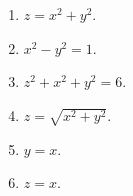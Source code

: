 \begin{enumialphparenastyle}
\begin{ex}
\begin{enumerate}
\item $z=x^{2}+y^{2}$.

\item $x^{2}-y^{2}=1$.

\item $z^{2}+x^{2}+y^{2}=6$.

\item $z=\sqrt{x^{2}+y^{2}}$.

\item $y=x$.

\item $z=x$.
\end{enumerate}
\end{ex}

\end{enumialphparenastyle}